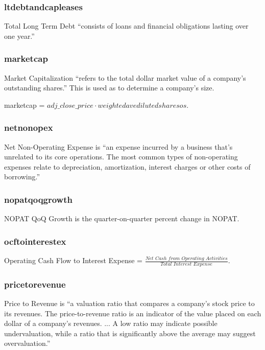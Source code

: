 \subsubsection{ltdebtandcapleases}
Total Long Term Debt ``consists of loans and financial obligations lasting over one year.''\cite{intrinioDataTags}

\subsubsection{marketcap}
Market Capitalization ``refers to the total dollar market value of a company's outstanding shares.'' This is used as to determine a company's size. \newline

marketcap = $adj\_close\_price \cdot weightedavedilutedsharesos$.\cite{intrinioDataTags}

\subsubsection{netnonopex}
Net Non-Operating Expense is ``an expense incurred by a business that's unrelated to its core operations. The most common types of non-operating expenses relate to depreciation, amortization, interest charges or other costs of borrowing.''\cite{intrinioDataTags}

\subsubsection{nopatqoqgrowth}
NOPAT QoQ Growth is the quarter-on-quarter percent change in NOPAT.

\subsubsection{ocftointerestex}
Operating Cash Flow to Interest Expense = $\frac{Net \,\, Cash \,\, from \,\, Operating \,\, Activities}{Total \,\, Interest \,\, Expense}$.\cite{intrinioDataTags}

\subsubsection{pricetorevenue}
Price to Revenue is ``a valuation ratio that compares a company's stock price to its revenues. The price-to-revenue ratio is an indicator of the value placed on each dollar of a company's revenues. ... A low ratio may indicate possible undervaluation, while a ratio that is significantly above the average may suggest overvaluation.''\cite{intrinioDataTags}

